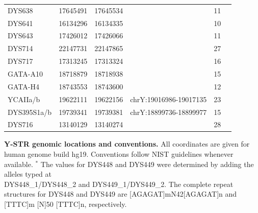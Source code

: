\begin{tabularx}{\linewidth}{l l l l l l }
DYS638      & 17645491 & 17645534 &                        & 11 \\
DYS641      & 16134296 & 16134335 &                        & 10 \\
DYS643      & 17426012 & 17426066 &                        & 11 \\
DYS714      & 22147731 & 22147865 &                        & 27 \\
DYS717      & 17313245 & 17313324 &                        & 16 \\
GATA-A10    & 18718879 & 18718938 &                        & 15 \\
GATA-H4     & 18743553 & 18743600 &                        & 12 \\
YCAIIa/b    & 19622111 & 19622156 & chrY:19016986-19017135 & 23 \\
DYS395S1a/b & 19739341 & 19739381 & chrY:18899736-18899977 & 15 \\
DYS716      & 13140129 & 13140274 &                        & 28 \\
\hline
\end{tabularx}
\textbf{Y-STR genomic locations and conventions.} All coordinates are given for human genome build hg19. Conventions follow NIST guidelines whenever available. $^*$ The values for DYS448 and DYS449 were determined by adding the alleles typed at \\
DYS448\_1/DYS448\_2 and DYS449\_1/DYS449\_2. The complete repeat structures for DYS448 and DYS449 are  [AGAGAT]mN42[AGAGAT]n and [TTTC]m [N]50 [TTTC]n, respectively.

\pagebreak
